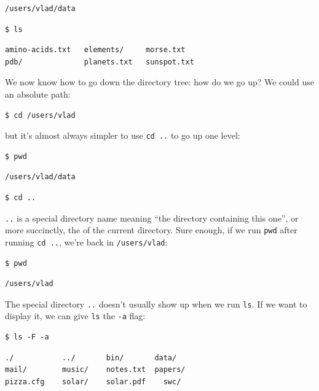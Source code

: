 \documentclass{book}
\begin{document}
\begin{verbatim}
/users/vlad/data
\end{verbatim}

\begin{verbatim}
$ ls
\end{verbatim}

\begin{verbatim}
amino-acids.txt   elements/     morse.txt
pdb/              planets.txt   sunspot.txt
\end{verbatim}

We now know how to go down the directory tree: how do we go up? We could
use an absolute path:

\begin{verbatim}
$ cd /users/vlad
\end{verbatim}

but it's almost always simpler to use \texttt{cd ..} to go up one level:

\begin{verbatim}
$ pwd
\end{verbatim}

\begin{verbatim}
/users/vlad/data
\end{verbatim}

\begin{verbatim}
$ cd ..
\end{verbatim}

\texttt{..} is a special directory name meaning ``the directory
containing this one'', or more succinctly, the
 of the current directory. Sure
enough, if we run \texttt{pwd} after running \texttt{cd ..}, we're back
in \texttt{/users/vlad}:

\begin{verbatim}
$ pwd
\end{verbatim}

\begin{verbatim}
/users/vlad
\end{verbatim}

The special directory \texttt{..} doesn't usually show up when we run
\texttt{ls}. If we want to display it, we can give \texttt{ls} the
\texttt{-a} flag:

\begin{verbatim}
$ ls -F -a
\end{verbatim}

\begin{verbatim}
./           ../       bin/       data/
mail/        music/    notes.txt  papers/
pizza.cfg    solar/    solar.pdf    swc/
\end{verbatim}
\end{document}
